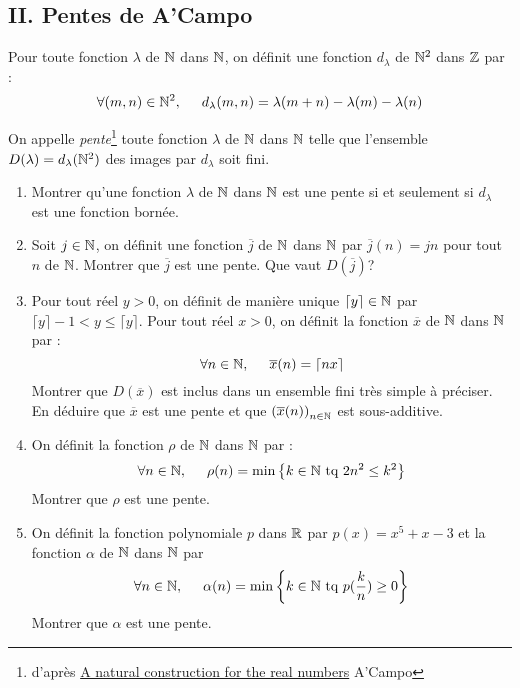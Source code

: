 \subsection*{II. Pentes de A'Campo}
Pour toute fonction $\lambda$ de $\mathbb{N}$ dans $\mathbb{N}$, on définit une fonction $d_\lambda$ de $\mathbb{N}^2$ dans $\mathbb{Z}$ par :
\begin{displaymath}
 \forall(m,n)\in \mathbb{N}^2,\hspace{0.5cm} d_\lambda(m,n) = \lambda(m+n) - \lambda(m) - \lambda(n)
\end{displaymath}

On appelle \emph{pente}\footnote{d'après \href{http://www.math.ethz.ch/~salamon/PREPRINTS/acampo-real.pdf}{A natural construction for the real numbers} A'Campo} toute fonction $\lambda$ de $\mathbb{N}$ dans $\mathbb{N}$ telle que l'ensemble $D(\lambda) = d_\lambda(\mathbb{N}^2)$ des images par $d_\lambda$ soit fini.
 \begin{enumerate}
 \item Montrer qu'une fonction $\lambda$ de $\mathbb{N}$ dans $\mathbb{N}$ est une pente si et seulement si $d_\lambda$ est une fonction bornée.
\item Soit $j\in \mathbb{N}$, on définit une fonction $\overline{j}$ de $\mathbb{N}$ dans $\mathbb{N}$ par $\overline{j}(n)=jn$ pour tout $n$ de $\mathbb{N}$.
Montrer que $\overline{j}$ est une pente. Que vaut $D(\overline{j})$?
\item Pour tout réel $y>0$, on définit de manière unique $\lceil y \rceil \in \mathbb{N}$ par $\lceil y \rceil - 1 < y \leq \lceil y \rceil$. Pour tout réel $x>0$, on définit la fonction $\overline{x}$ de $\mathbb{N}$ dans $\mathbb{N}$ par :
\begin{displaymath}
 \forall n\in \mathbb{N},\hspace{0.5cm} \overline{x} (n) = \lceil nx \rceil
\end{displaymath}
Montrer que $D(\overline{x})$ est inclus dans un ensemble fini très simple à préciser. En déduire que $\overline{x}$ est une pente et que $\left( \overline{x}(n)\right) _{n\in \mathbb{N}}$ est sous-additive.
\item On définit la fonction $\rho$ de $\mathbb{N}$ dans $\mathbb{N}$ par :
\begin{displaymath}
  \forall n\in \mathbb{N},\hspace{0.5cm} \rho (n) = \min\left\lbrace k\in \mathbb{N}\text{ tq } 2n^2\leq k^2 \right\rbrace 
\end{displaymath}
Montrer que $\rho$ est une pente.
\item On définit la fonction polynomiale $p$ dans $\mathbb{R}$ par $p(x)=x^5+x-3$ et la fonction $\alpha$ de $\mathbb{N}$ dans $\mathbb{N}$ par
\begin{displaymath}
  \forall n\in \mathbb{N},\hspace{0.5cm} \alpha (n) = \min\left\lbrace k\in \mathbb{N}\text{ tq } p(\frac{k}{n})\geq 0 \right\rbrace 
\end{displaymath}
Montrer que $\alpha$ est une pente.
 \end{enumerate}

